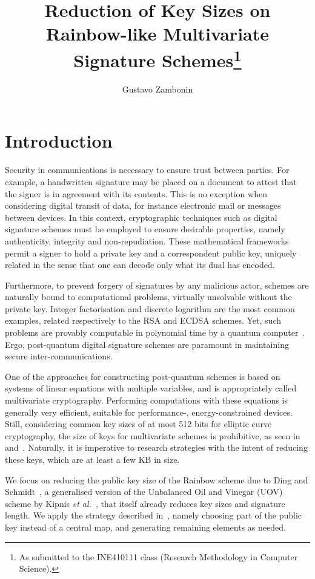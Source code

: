 \documentclass[12pt]{article}
\title{Reduction of Key Sizes on Rainbow-like Multivariate Signature Schemes\footnote{
    As submitted to the INE410111 class (Research Methodology in Computer Science).}}
\author{Gustavo Zambonin\inst{1}}
\begin{document}
 

\maketitle

\section{Introduction}\label{sec:intro}

Security in communications is necessary to ensure trust between parties. For example, a handwritten signature may be placed on a document to attest that the signer is in agreement with its contents. This is no exception when considering digital transit of data, for instance electronic mail or messages between devices. In this context, cryptographic techniques such as digital signature schemes must be employed to ensure desirable properties, namely authenticity, integrity and non-repudiation. These mathematical frameworks permit a signer to hold a private key and a correspondent public key, uniquely related in the sense that one can decode only what its dual has encoded. 

Furthermore, to prevent forgery of signatures by any malicious actor, schemes are naturally bound to computational problems, virtually unsolvable without the private key. Integer factorisation and discrete logarithm are the most common examples, related respectively to the RSA and ECDSA schemes. Yet, such problems are provably computable in polynomial time by a quantum computer~\cite{Shor:article:1997:oct}. Ergo, post-quantum digital signature schemes are paramount in maintaining secure inter-communications.

One of the approaches for constructing post-quantum schemes is based on systems of linear equations with multiple variables, and is appropriately called multivariate cryptography. Performing computations with these equations is generally very efficient, suitable for performance-, energy-constrained devices. Still, considering common key sizes of at most 512 bits for elliptic curve cryptography, the size of keys for multivariate schemes is prohibitive, as seen in~\cite[Table 6.4]{Petzoldt:phd:2013:jul} and~\cite[Table 1]{Ding:article:2017:jul}. Naturally, it is imperative to research strategies with the intent of reducing these keys, which are at least a few KB in size.

We focus on reducing the public key size of the Rainbow scheme due to Ding and Schmidt~\cite{Ding:inproc:2005:jun}, a generalised version of the Unbalanced Oil and Vinegar (UOV) scheme by Kipnis \emph{et al.}~\cite{Kipnis:inproc:1999:apr}, that itself already reduces key sizes and signature length. We apply the strategy described in~\cite[Chapter 7]{Petzoldt:phd:2013:jul}, namely choosing part of the public key instead of a central map, and generating remaining elements as needed.
\end{document}
